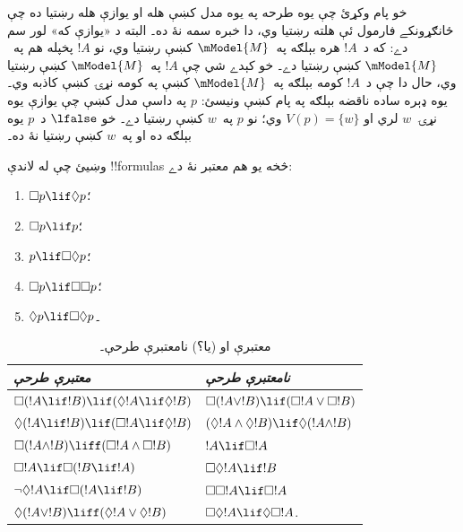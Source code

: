 \documentclass[../../../include/open-logic-section]{subfiles}
\begin{document}
خو پام وکړئ چې يوه طرحه په يوه مدل کښې هله او يوازې هله رښتيا ده چې
ځانګړونکے فارمول ئې هلته رښتيا وي، دا خبره سمه نۀ ده۔ البته د
«يوازې که» لور سم دے: که د~$!A$ هره بېلګه په~$\mModel{M}$ کښې
رښتيا وي، نو $!A$ پخپله هم په~$\mModel{M}$ کښې رښتيا دے۔ خو کېدے
شي چې $!A$ په~$\mModel{M}$ کښې رښتيا وي، حال دا چې د~$!A$
کومه بېلګه په~$\mModel{M}$ کښې په کومه نړۍ کښې کاذبه وي۔ يوه ډېره ساده
ناقضه بېلګه په پام کښې ونيسئ: $p$ په داسې مدل کښې چې يوازې يوه
نړۍ~$w$ لري او $V(p) = \{w\}$ وي؛ نو $p$ په~$w$ کښې رښتيا دے۔
خو $\lfalse$ د~$p$ يوه بېلګه ده او په~$w$ کښې رښتيا نۀ ده۔

\begin{prob}
  وښيئ چې له لاندې !!{formula}s څخه يو هم معتبر نۀ دے:
  \begin{enumerate}
    \item[\Ax{D}:] \quad $\Box p \lif \Diamond p$؛
    \item[\Ax{T}:] \quad $\Box p \lif p$؛
    \item[\Ax{B}:] \quad $p \lif \Box\Diamond p$؛
    \item[\Ax{4}:] \quad $\Box p \lif \Box \Box p$؛
    \item[\Ax{5}:] \quad $\Diamond p \lif \Box \Diamond
      p$۔
  \end{enumerate}
\end{prob}

\begin{table}[t]
    \centering
    \begin{tabular}{| l || l |}
      \hline
      {\emph{معتبرې طرحې}} & {\emph{نامعتبرې طرحې}} \\
      \hline\hline
      $\Box(!A \lif !B) \lif (\Diamond !A \lif \Diamond !B)$
      & $\Box (!A \lor !B) \lif (\Box !A \lor \Box !B)$ \\
      $\Diamond (!A \lif !B) \lif (\Box !A \lif \Diamond
      !B)$
      & $(\Diamond !A \land \Diamond !B) \lif \Diamond (!A
      \land !B)$\\
      $\Box (!A \land !B) \liff (\Box !A \land \Box !B)$
      & $!A \lif \Box !A$ \\
      $\Box !A \lif \Box (!B \lif !A)$
      & $\Box \Diamond !A \lif !B$ \\
      $\lnot \Diamond !A \lif \Box (!A \lif !B)$
      & $\Box \Box !A \lif \Box !A$ \\
      $\Diamond (!A \lor !B) \liff (\Diamond !A \lor
      \Diamond !B)$
      & $\Box \Diamond !A \lif \Diamond \Box !A$. \\
      \hline
    \end{tabular}
    \caption{معتبرې او (يا؟) نامعتبرې طرحې۔}
\end{table}
\end{document}

